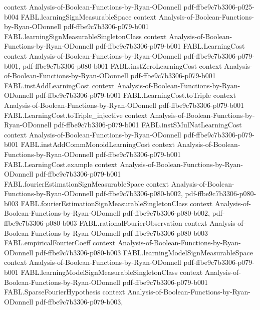 \begin{theorem}
  {context}
  {Analysis-of-Boolean-Functions-by-Ryan-ODonnell}
  {pdf-ffbe9c7b3306-p025-b004}
\proofstep
  {FABL.learningSignMeasurableSpace}
  {context}
  {Analysis-of-Boolean-Functions-by-Ryan-ODonnell}
  {pdf-ffbe9c7b3306-p079-b001}
\proofstep
  {FABL.learningSignMeasurableSingletonClass}
  {context}
  {Analysis-of-Boolean-Functions-by-Ryan-ODonnell}
  {pdf-ffbe9c7b3306-p079-b001}
\proofstep
  {FABL.LearningCost}
  {context}
  {Analysis-of-Boolean-Functions-by-Ryan-ODonnell}
  {pdf-ffbe9c7b3306-p079-b001,
    pdf-ffbe9c7b3306-p080-b001}
\proofstep
  {FABL.instZeroLearningCost}
  {context}
  {Analysis-of-Boolean-Functions-by-Ryan-ODonnell}
  {pdf-ffbe9c7b3306-p079-b001}
\proofstep
  {FABL.instAddLearningCost}
  {context}
  {Analysis-of-Boolean-Functions-by-Ryan-ODonnell}
  {pdf-ffbe9c7b3306-p079-b001}
\proofstep
  {FABL.LearningCost.toTriple}
  {context}
  {Analysis-of-Boolean-Functions-by-Ryan-ODonnell}
  {pdf-ffbe9c7b3306-p079-b001}
\proofstep
  {FABL.LearningCost.toTriple_injective}
  {context}
  {Analysis-of-Boolean-Functions-by-Ryan-ODonnell}
  {pdf-ffbe9c7b3306-p079-b001}
\proofstep
  {FABL.instSMulNatLearningCost}
  {context}
  {Analysis-of-Boolean-Functions-by-Ryan-ODonnell}
  {pdf-ffbe9c7b3306-p079-b001}
\proofstep
  {FABL.instAddCommMonoidLearningCost}
  {context}
  {Analysis-of-Boolean-Functions-by-Ryan-ODonnell}
  {pdf-ffbe9c7b3306-p079-b001}
\proofstep
  {FABL.LearningCost.example}
  {context}
  {Analysis-of-Boolean-Functions-by-Ryan-ODonnell}
  {pdf-ffbe9c7b3306-p079-b001}
\proofstep
  {FABL.fourierEstimationSignMeasurableSpace}
  {context}
  {Analysis-of-Boolean-Functions-by-Ryan-ODonnell}
  {pdf-ffbe9c7b3306-p080-b002,
    pdf-ffbe9c7b3306-p080-b003}
\proofstep
  {FABL.fourierEstimationSignMeasurableSingletonClass}
  {context}
  {Analysis-of-Boolean-Functions-by-Ryan-ODonnell}
  {pdf-ffbe9c7b3306-p080-b002,
    pdf-ffbe9c7b3306-p080-b003}
\proofstep
  {FABL.rationalFourierObservation}
  {context}
  {Analysis-of-Boolean-Functions-by-Ryan-ODonnell}
  {pdf-ffbe9c7b3306-p080-b003}
\proofstep
  {FABL.empiricalFourierCoeff}
  {context}
  {Analysis-of-Boolean-Functions-by-Ryan-ODonnell}
  {pdf-ffbe9c7b3306-p080-b003}
\proofstep
  {FABL.learningModelSignMeasurableSpace}
  {context}
  {Analysis-of-Boolean-Functions-by-Ryan-ODonnell}
  {pdf-ffbe9c7b3306-p079-b001}
\proofstep
  {FABL.learningModelSignMeasurableSingletonClass}
  {context}
  {Analysis-of-Boolean-Functions-by-Ryan-ODonnell}
  {pdf-ffbe9c7b3306-p079-b001}
\proofstep
  {FABL.SparseFourierHypothesis}
  {context}
  {Analysis-of-Boolean-Functions-by-Ryan-ODonnell}
  {pdf-ffbe9c7b3306-p079-b003,
}
\end{theorem}
